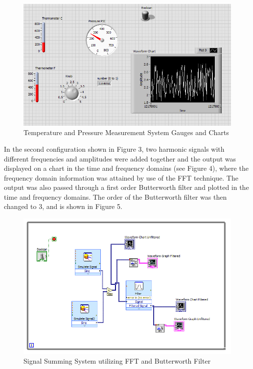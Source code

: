 \documentclass[12pt]{article}
\begin{document}
\bigskip

\begin{figure}[h!] %
   \centering
   \includegraphics[width=5.5in]{lab_4a_grid.PNG} 
   \caption{Temperature and Pressure Measurement System Gauges and Charts}
   \label{fig:example}
\end{figure}

\newpage


In the second configuration shown in Figure 3, two harmonic signals with different frequencies and amplitudes were added together and the output was displayed on a chart in the time and frequency domains (see Figure 4), where the frequency domain information was attained by use of the FFT technique. The output was also passed through a first order Butterworth filter and plotted in the time and frequency domains. The order of the Butterworth filter was then changed to 3, and is shown in Figure 5. 
\bigskip
\bigskip
\bigskip
\bigskip

\begin{figure}[h!] %
   \centering
   \includegraphics[width=\linewidth]{lab_4b.PNG} 
   \caption{Signal Summing System utilizing FFT and Butterworth Filter}
   \label{fig:example}
\end{figure}
\end{document}
